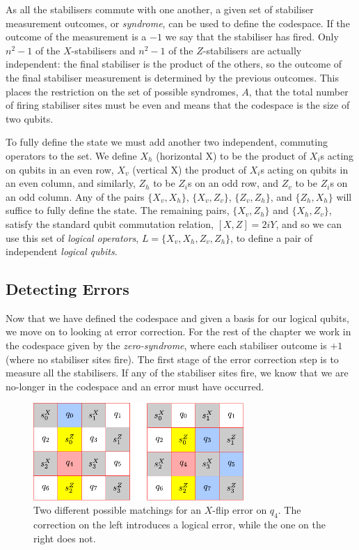 As all the stabilisers commute with one another, a given set of stabiliser measurement outcomes, or {\it syndrome}, can be used to define the codespace. If the outcome of the measurement is a $-1$ we say that the stabiliser has fired. Only $n^2-1$ of the $X$-stabilisers and $n^2-1$ of the $Z$-stabilisers are actually independent: the final stabiliser is the product of the others, so the outcome of the final stabiliser measurement is determined by the previous outcomes. This places the restriction on the set of possible syndromes, $A$, that the total number of firing stabiliser sites must be even and means that the codespace is the size of two qubits.

To fully define the state we must add another two independent, commuting operators to the set. We define $X_h$ (horizontal X) to be the product of $X_i$s acting on qubits in an even row, $X_v$ (vertical X) the product of $X_i$s acting on qubits in an even column, and similarly, $Z_h$ to be $Z_i$s on an odd row, and $Z_v$ to be $Z_i$s on an odd column. Any of the pairs $\{X_v, X_h\}$, $\{X_v, Z_v\}$, $\{Z_v, Z_h\}$, and $\{Z_h, X_h\}$ will suffice to fully define the state. The remaining pairs, $\{X_v, Z_h\}$ and $\{X_h, Z_v\}$, satisfy the standard qubit commutation relation, $[X, Z] = 2iY$, and so we can use this set of \textit{logical operators}, $L = \{X_v, X_h, Z_v , Z_h\}$, to define a pair of independent \textit{logical qubits}. 

\subsection{Detecting Errors}

Now that we have defined the codespace and given a basis for our logical qubits, we move on to looking at error correction. For the rest of the chapter we work in the codespace given by the \textit{zero-syndrome}, where each stabiliser outcome is $+1$ (where no stabiliser sites fire). The first stage of the error correction step is to measure all the stabilisers. If any of the stabiliser sites fire, we know that we are no-longer in the codespace and an error must have occurred.

\begin{figure}[htb]
  \begin{center}
    \includegraphics[width=8cm]{assets/4-code_error_correct.pdf}
  \end{center}
  \caption{Two different possible matchings for an $X$-flip error on $q_4$. The correction on the left introduces a logical error, while the one on the right does not.}
  \label{4-code_error_correct}
\end{figure}

